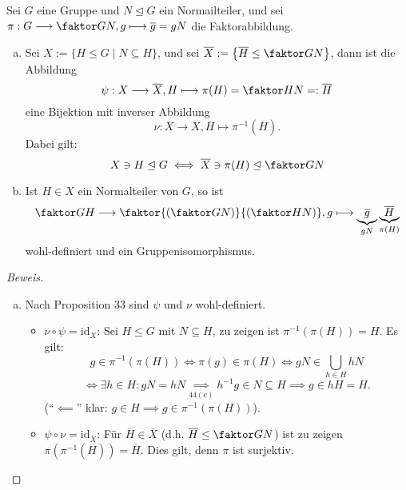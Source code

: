 \documentclass[a4paper]{report}
\begin{document}
\begin{satz}
  Sei $G$ eine Gruppe und $N \trianglelefteq G$ ein Normailteiler, und sei $\pi : G \longrightarrow \faktor GN, g \longmapsto \overline g = gN $ die Faktorabbildung.
  \begin{enumerate}[(a)]
    \item Sei $X:= \{H \le G \mid N \subseteq H\}$, und sei $\overline X := \left\{\overline H \le \faktor GN\right\}$, dann ist die Abbildung $$\psi : X \longrightarrow \overline X, H \longmapsto \pi(H) = \faktor HN =: \overline H$$
          eine Bijektion mit inverser Abbildung $$\nu: \overline X \longrightarrow X, \overline H \longmapsto \pi^{-1}(\overline H).$$
          Dabei gilt:
          $$X \ni H \trianglelefteq G \iff \overline X \ni \pi(H) \trianglelefteq \faktor GN$$
    \item Ist $H \in X$ ein Normalteiler von $G$, so ist
          $$\faktor GH \longrightarrow \faktor{\left(\faktor GN\right)}{\left(\faktor HN \right)}, g \longmapsto \underbrace{\overline g}_{gN} \underbrace{\overline H}_{\pi(H)}$$
          wohl-definiert und ein Gruppenisomorphismus.
  \end{enumerate}
\begin{proof}[Beweis]
  \begin{enumerate}[(a)]
    \item Nach Proposition 33 sind $\psi$ und $\nu$ wohl-definiert.
\begin{itemize}

          \item $\nu \circ \psi = \mathrm{id}_{X}$: Sei $H \le G$ mit $N \subseteq H$, zu zeigen ist $\pi^{-1}(\pi(H)) = H$. Es gilt:
          $$g \in \pi^{-1}(\pi(H)) \iff \pi(g) \in \pi(H) \iff gN \in \bigcup_{h \in H}hN$$
          $$\iff \exists h \in H : gN = hN \underset{44(c)}\implies h^{-1}g \in N \subseteq H \implies g \in hH = H.$$
          (``$\impliedby$'' klar: $g \in H \implies g \in \pi^{-1}(\pi(H))$).

          \item $\psi \circ \nu = \mathrm{id}_{\overline X}$: Für $\overline H \in \overline X$ (d.h. $\overline H \le \faktor GN$) ist zu zeigen $\pi(\pi^{-1}(\overline H)) = \overline H$. Dies gilt, denn $\pi$ ist surjektiv.


\end{itemize}
\end{enumerate}
\end{proof}
\end{satz}
\end{document}
